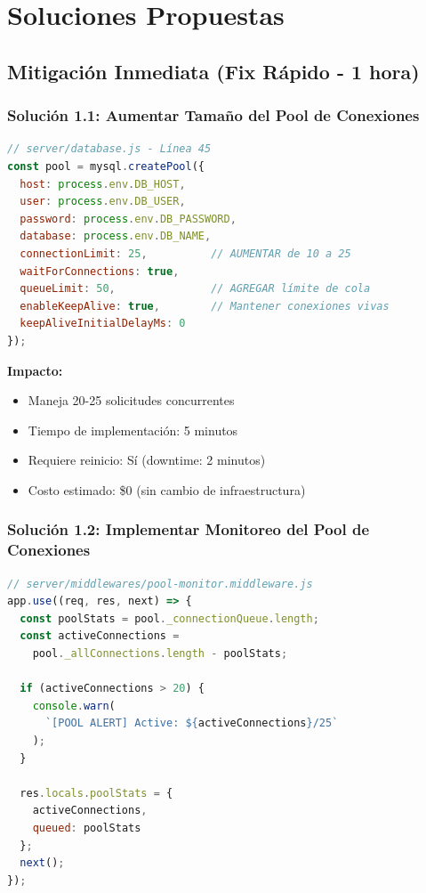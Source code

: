 \documentclass[12pt,a4paper]{article}
\begin{document}
\newpage

\section{Soluciones Propuestas}

\subsection{Mitigación Inmediata (Fix Rápido - 1 hora)}

\subsubsection{Solución 1.1: Aumentar Tamaño del Pool de Conexiones}

\begin{lstlisting}[language=JavaScript, caption=Aumento de pool size en server/database.js]
// server/database.js - Línea 45
const pool = mysql.createPool({
  host: process.env.DB_HOST,
  user: process.env.DB_USER,
  password: process.env.DB_PASSWORD,
  database: process.env.DB_NAME,
  connectionLimit: 25,          // AUMENTAR de 10 a 25
  waitForConnections: true,
  queueLimit: 50,               // AGREGAR límite de cola
  enableKeepAlive: true,        // Mantener conexiones vivas
  keepAliveInitialDelayMs: 0
});
\end{lstlisting}

\textbf{Impacto:}
\begin{itemize}
    \item Maneja 20-25 solicitudes concurrentes
    \item Tiempo de implementación: 5 minutos
    \item Requiere reinicio: Sí (downtime: 2 minutos)
    \item Costo estimado: \$0 (sin cambio de infraestructura)
\end{itemize}

\subsubsection{Solución 1.2: Implementar Monitoreo del Pool de Conexiones}

\begin{lstlisting}[language=JavaScript, caption=Middleware de monitoreo]
// server/middlewares/pool-monitor.middleware.js
app.use((req, res, next) => {
  const poolStats = pool._connectionQueue.length;
  const activeConnections = 
    pool._allConnections.length - poolStats;
  
  if (activeConnections > 20) {
    console.warn(
      `[POOL ALERT] Active: ${activeConnections}/25`
    );
  }
  
  res.locals.poolStats = { 
    activeConnections, 
    queued: poolStats 
  };
  next();
});
\end{lstlisting}
\end{document}
